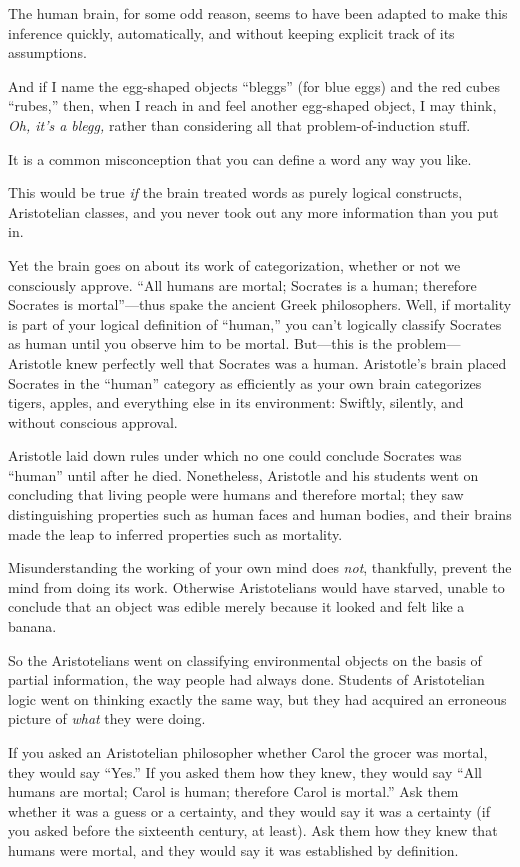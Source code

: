 {
 The human brain, for some odd reason, seems to have been adapted
to make this inference quickly, automatically, and without keeping
explicit track of its assumptions.}

{
 And if I name the egg-shaped objects
``bleggs'' (for blue eggs) and the
red cubes ``rubes,'' then, when I
reach in and feel another egg-shaped object, I may think, \textit{Oh,
it's a blegg,} rather than considering all that
problem-of-induction stuff.}

{
 It is a common misconception that you can define a word any way
you like.}

{
 This would be true \textit{if} the brain treated words as purely
logical constructs, Aristotelian classes, and you never took out any
more information than you put in.}

{
 Yet the brain goes on about its work of categorization, whether or
not we consciously approve. ``All humans are mortal;
Socrates is a human; therefore Socrates is
mortal''---thus spake the ancient Greek philosophers.
Well, if mortality is part of your logical definition of
``human,'' you can't
logically classify Socrates as human until you observe him to be
mortal. But---this is the problem---Aristotle knew perfectly well that
Socrates was a human. Aristotle's brain placed Socrates
in the ``human'' category as
efficiently as your own brain categorizes tigers, apples, and
everything else in its environment: Swiftly, silently, and without
conscious approval.}

{
 Aristotle laid down rules under which no one could conclude
Socrates was ``human'' until after
he died. Nonetheless, Aristotle and his students went on concluding
that living people were humans and therefore mortal; they saw
distinguishing properties such as human faces and human bodies, and
their brains made the leap to inferred properties such as mortality.}

{
 Misunderstanding the working of your own mind does \textit{not},
thankfully, prevent the mind from doing its work. Otherwise
Aristotelians would have starved, unable to conclude that an object was
edible merely because it looked and felt like a banana.}

{
 So the Aristotelians went on classifying environmental objects on
the basis of partial information, the way people had always done.
Students of Aristotelian logic went on thinking exactly the same way,
but they had acquired an erroneous picture of \textit{what} they were
doing.}

{
 If you asked an Aristotelian philosopher whether Carol the grocer
was mortal, they would say ``Yes.''
If you asked them how they knew, they would say ``All
humans are mortal; Carol is human; therefore Carol is
mortal.'' Ask them whether it was a guess or a
certainty, and they would say it was a certainty (if you asked before
the sixteenth century, at least). Ask them how they knew that humans
were mortal, and they would say it was established by definition.}

